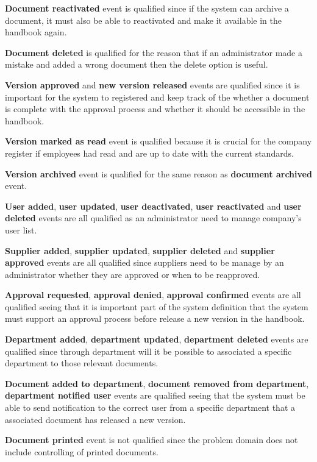 \textbf{Document reactivated} event is qualified since if the system can  archive a document, it must also be able to reactivated and make it available in the handbook again. 

\textbf{Document deleted} is qualified for the reason that if an administrator made a mistake and added a wrong document then the delete option is useful. 

\textbf{Version approved} and \textbf{new version released} events are qualified since it is important for the system to registered and keep track of the whether a document is complete with the approval process and whether it should be accessible in the handbook. 

\textbf{Version marked as read} event is qualified because it is crucial for the company register if employees had read and are up to date with the current standards. 

\textbf{Version archived} event is qualified for the same reason as \textbf{document archived} event.

\textbf{User added}, \textbf{user updated}, \textbf{user deactivated}, \textbf{user reactivated} and \textbf{user deleted} events are all qualified as an administrator need to manage company's user list. 

\textbf{Supplier added}, \textbf{supplier updated},  \textbf{supplier deleted} and \textbf{supplier approved} events are all qualified since suppliers need to be manage by an administrator whether they are approved or when to be reapproved. 

\textbf{Approval requested}, \textbf{approval denied}, \textbf{approval confirmed} events are all qualified seeing that it is important part of the system definition that the system must support an approval process before release a new version in the handbook. 

\textbf{Department added}, \textbf{department updated}, \textbf{department deleted} events are qualified since through department will it be possible to associated a specific department to those relevant documents. 

\textbf{Document added to department}, \textbf{document removed from department}, \textbf{department notified user} events are qualified seeing that the system must be able to send notification to the correct user from a specific department that a associated document has released a new version. 

\textbf{Document printed} event is not qualified since the problem domain does not include controlling of printed documents.

